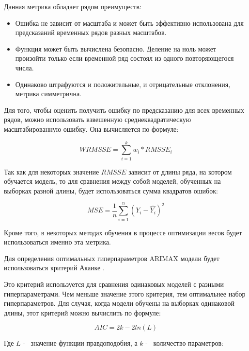 Данная метрика обладает рядом преимуществ:

\begin{itemize}
	\item Ошибка не зависит от масштаба и может быть эффективно использована для предсказаний временных рядов разных масштабов.
	\item Функция может быть вычислена безопасно. Деление на ноль может произойти только если временной ряд состоял из одного повторяющегося числа.
	\item Одинаково штрафуются и положительные, и отрицательные отклонения, метрика симметрична.
\end{itemize}

Для того, чтобы оценить получить ошибку по предсказанию для всех временных рядов,
можно использовать взвешенную среднеквадратическую масштабированную ошибку.
Она вычисляется по формуле:

\begin{equation}\label{eq:wrmsse}
	WRMSSE = \sum_{i=1}^{k} w_i * RMSSE_i
\end{equation}

Так как для некоторых значение $ RMSSE $ зависит от длины ряда, на котором обучается
модель, то для сравнения между собой моделей, обученных на выборках разной длины,
будет использоваться сумма квадратов ошибок:

\begin{equation}\label{eq:mse}
	MSE = \frac{1}{n} \sum_{i=1}^{n} (Y_i  - \hat{Y_i})^2
\end{equation}

\noindent Кроме того, в некоторых методах обучения
в процессе оптимизации весов будет использоваться именно эта метрика.


Для определения оптимальных гиперпараметров ARIMAX модели будет использоваться критерий Акаике \cite{sakamoto1986akaike, akaike, wagenmakers2004aic}.

Это критерий используется для сравнения одинаковых моделей с разными гиперпараметрами.
Чем меньше значение этого критерия, тем оптимальнее набор гиперпараметров.
Для случая, когда модели обучены на выборках одинаковой длины, этот критерий можно вычислить по формуле:

\begin{equation}\label{eq:akaike}
	AIC = 2k - 2 ln(L)
\end{equation}

\noindent Где $ L $ -~ значение функции правдоподобия,
а $ k $ -~ количество параметров:

